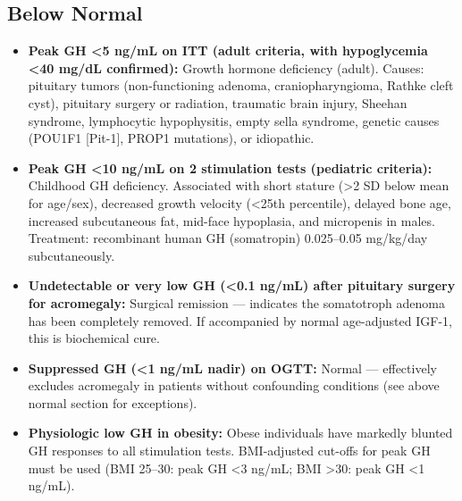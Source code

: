 \subsection*{Below Normal}
\begin{itemize}
  \item \textbf{Peak GH <5 ng/mL on ITT (adult criteria, with hypoglycemia <40 mg/dL confirmed):} Growth hormone deficiency (adult). Causes: pituitary tumors (non-functioning adenoma, craniopharyngioma, Rathke cleft cyst), pituitary surgery or radiation, traumatic brain injury, Sheehan syndrome, lymphocytic hypophysitis, empty sella syndrome, genetic causes (POU1F1 [Pit-1], PROP1 mutations), or idiopathic.
  \item \textbf{Peak GH <10 ng/mL on 2 stimulation tests (pediatric criteria):} Childhood GH deficiency. Associated with short stature (>2 SD below mean for age/sex), decreased growth velocity (<25th percentile), delayed bone age, increased subcutaneous fat, mid-face hypoplasia, and micropenis in males. Treatment: recombinant human GH (somatropin) 0.025--0.05 mg/kg/day subcutaneously.
  \item \textbf{Undetectable or very low GH (<0.1 ng/mL) after pituitary surgery for acromegaly:} Surgical remission --- indicates the somatotroph adenoma has been completely removed. If accompanied by normal age-adjusted IGF-1, this is biochemical cure.
  \item \textbf{Suppressed GH (<1 ng/mL nadir) on OGTT:} Normal --- effectively excludes acromegaly in patients without confounding conditions (see above normal section for exceptions).
  \item \textbf{Physiologic low GH in obesity:} Obese individuals have markedly blunted GH responses to all stimulation tests. BMI-adjusted cut-offs for peak GH must be used (BMI 25--30: peak GH <3 ng/mL; BMI >30: peak GH <1 ng/mL).
\end{itemize}

